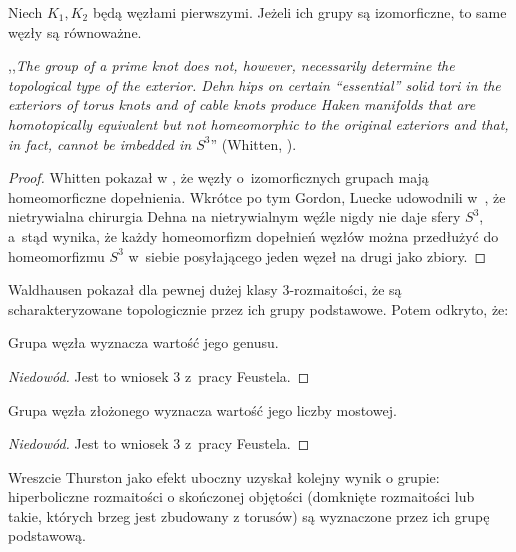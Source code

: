 \begin{proposition}
    Niech $K_1, K_2$ będą węzłami pierwszymi.
    Jeżeli ich grupy są izomorficzne, to same węzły są równoważne.
\end{proposition}

,,\emph{The group of a prime knot does not, however, necessarily determine the topological type of the exterior. Dehn hips on certain “essential” solid tori in the exteriors of torus knots and of cable knots produce Haken manifolds that are homotopically equivalent but not homeomorphic to the original exteriors and that, in fact, cannot be imbedded in $S^3$}'' (Whitten, \cite{whitten87}).
%

\begin{proof}
%
%
%
    Whitten pokazał w \cite{whitten87}, że węzły o~izomorficznych grupach mają homeomorficzne dopełnienia.
    Wkrótce po tym Gordon, Luecke udowodnili w~\cite{gordon89}, że nietrywialna chirurgia Dehna na nietrywialnym węźle nigdy nie daje sfery $S^3$, a~stąd wynika, że każdy homeomorfizm dopełnień węzłów można przedłużyć do homeomorfizmu $S^3$ w~siebie posyłającego jeden węzeł na drugi jako zbiory.
%
\end{proof}

Waldhausen \cite{waldhausen68} pokazał dla pewnej dużej klasy 3-rozmaitości, że są scharakteryzowane topologicznie przez ich grupy podstawowe.
%
Potem odkryto, że:

\begin{proposition}
    Grupa węzła wyznacza wartość jego genusu.
\end{proposition}
\begin{proof}[Niedowód]
    Jest to wniosek 3 z~pracy \cite{feustel78} Feustela.
\end{proof}
\begin{proposition}
    Grupa węzła złożonego wyznacza wartość jego liczby mostowej.
\end{proposition}
\begin{proof}[Niedowód]
    Jest to wniosek 3 z~pracy \cite{feustel78} Feustela.
\end{proof}

Wreszcie Thurston \cite{thurston82} jako efekt uboczny uzyskał kolejny wynik o grupie: hiperboliczne rozmaitości o skończonej objętości (domknięte rozmaitości lub takie, których brzeg jest zbudowany z torusów) są wyznaczone przez ich grupę podstawową.
%

